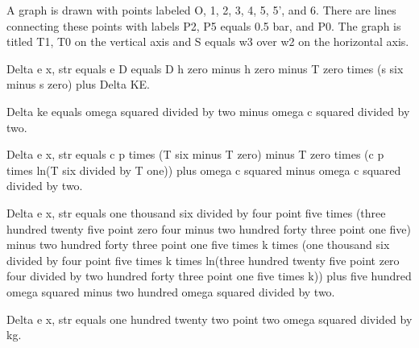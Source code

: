 A graph is drawn with points labeled O, 1, 2, 3, 4, 5, 5', and 6. There are lines connecting these points with labels P2, P5 equals 0.5 bar, and P0. The graph is titled T1, T0 on the vertical axis and S equals w3 over w2 on the horizontal axis.

Delta e x, str equals e D equals D h zero minus h zero minus T zero times (s six minus s zero) plus Delta KE.

Delta ke equals omega squared divided by two minus omega c squared divided by two.

Delta e x, str equals c p times (T six minus T zero) minus T zero times (c p times ln(T six divided by T one)) plus omega c squared minus omega c squared divided by two.

Delta e x, str equals one thousand six divided by four point five times (three hundred twenty five point zero four minus two hundred forty three point one five) minus two hundred forty three point one five times k times (one thousand six divided by four point five times k times ln(three hundred twenty five point zero four divided by two hundred forty three point one five times k)) plus five hundred omega squared minus two hundred omega squared divided by two.

Delta e x, str equals one hundred twenty two point two omega squared divided by kg.